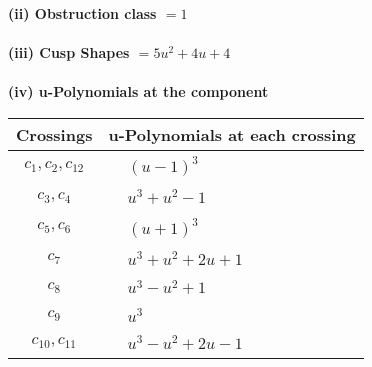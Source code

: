 \documentclass[1p]{elsarticle_modified}
\theoremstyle{definition}
\begin{document}
\flushleft \textbf{(ii) Obstruction class $= 1$}\\~\\
\flushleft \textbf{(iii) Cusp Shapes $= 5 u^2+4 u+4$}\\~\\
\newpage\renewcommand{\arraystretch}{1}
\flushleft \textbf{(iv) u-Polynomials at the component}\newline \\
\begin{tabular}{m{50pt}|m{274pt}}
Crossings & \hspace{64pt}u-Polynomials at each crossing \\
\hline $$\begin{aligned}c_{1},c_{2},c_{12}\end{aligned}$$&$\begin{aligned}
&(u-1)^3
\end{aligned}$\\
\hline $$\begin{aligned}c_{3},c_{4}\end{aligned}$$&$\begin{aligned}
&u^3+u^2-1
\end{aligned}$\\
\hline $$\begin{aligned}c_{5},c_{6}\end{aligned}$$&$\begin{aligned}
&(u+1)^3
\end{aligned}$\\
\hline $$\begin{aligned}c_{7}\end{aligned}$$&$\begin{aligned}
&u^3+u^2+2 u+1
\end{aligned}$\\
\hline $$\begin{aligned}c_{8}\end{aligned}$$&$\begin{aligned}
&u^3- u^2+1
\end{aligned}$\\
\hline $$\begin{aligned}c_{9}\end{aligned}$$&$\begin{aligned}
&u^3
\end{aligned}$\\
\hline $$\begin{aligned}c_{10},c_{11}\end{aligned}$$&$\begin{aligned}
&u^3- u^2+2 u-1
\end{aligned}$\\
\hline
\end{tabular}\\~\\
\end{document}
